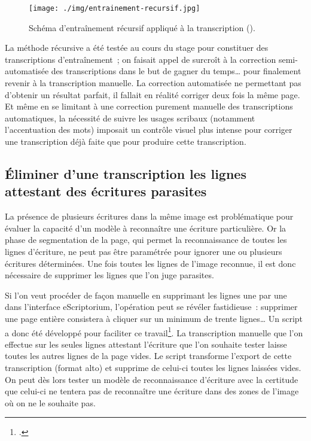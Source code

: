 \documentclass[a4paper,12pt,twoside]{book}
\begin{document}
				\begin{figure}[!h]
					\centering
					\texttt{[image: ./img/entrainement-recursif.jpg]}
					\caption{Schéma d'entraînement récursif appliqué à la transcription (\cite{pincheHTRPresentationProblematiques2021}).}
					\label{fig}
				\end{figure}
							
				La méthode récursive a été testée au cours du stage pour constituer des transcriptions d'entraînement~; on faisait appel de surcroît à la correction semi-automatisée des transcriptions dans le but de gagner du temps… pour finalement revenir à la transcription manuelle. La correction automatisée ne permettant pas d'obtenir un résultat parfait, il fallait en réalité corriger deux fois la même page. Et même en se limitant à une correction purement manuelle des transcriptions automatiques, la nécessité de suivre les usages scribaux (notamment l'accentuation des mots) imposait un contrôle visuel plus intense pour corriger une transcription déjà faite que pour produire cette transcription.
			
			\subsection{Éliminer d'une transcription les lignes attestant des écritures parasites}
				
				La présence de plusieurs écritures dans la même image est problématique pour évaluer la capacité d'un modèle à reconnaître une écriture particulière. Or la phase de \gls{segmentation} de la page, qui permet la reconnaissance de toutes les lignes d'écriture, ne peut pas être paramétrée pour ignorer une ou plusieurs écritures déterminées. Une fois toutes les lignes de l'image reconnue, il est donc nécessaire de supprimer les lignes que l'on juge parasites.
				
				Si l'on veut procéder de façon manuelle en supprimant les lignes une par une dans l'interface eScriptorium, l'opération peut se révéler fastidieuse~: supprimer une page entière consistera à cliquer sur un minimum de trente lignes… Un script a donc été développé pour faciliter ce travail\footcite{biaySupprLignesVidesPy2022}. La transcription manuelle que l'on effectue sur les seules lignes attestant l'écriture que l'on souhaite tester laisse toutes les autres lignes de la page vides. Le script transforme l'export de cette transcription (format \gls{alto}) et supprime de celui-ci toutes les lignes laissées vides. On peut dès lors tester un modèle de reconnaissance d'écriture avec la certitude que celui-ci ne tentera pas de reconnaître une écriture dans des zones de l'image où on ne le souhaite pas.
				
\end{document}
